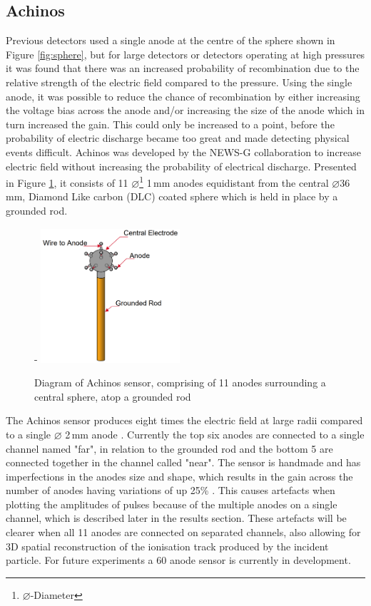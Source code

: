 \documentclass[a4paper]{article}
\begin{document}
\subsection{Achinos} \label{Ach}
Previous detectors used a single anode at the centre of the sphere shown in Figure \ref{fig:sphere}, but for large detectors or detectors operating at high pressures it was found that there was an increased probability of recombination due to the relative strength of the electric field compared to the pressure. Using the single anode, it was possible to reduce the chance of recombination by either increasing the voltage bias across the anode and/or increasing the size of the anode which in turn increased the gain. This could only be increased to a point, before the probability of electric discharge became too great and made detecting physical events difficult. 
\newline Achinos was developed by the NEWS-G collaboration to increase electric field without increasing the probability of electrical discharge. Presented in Figure \ref{fig:achinos}, it consists of 11 $\diameter$\footnote{$\diameter$-Diameter} 1\,mm anodes equidistant from the central $\diameter$36\,mm, Diamond Like carbon (DLC) coated sphere which is held in place by a grounded rod. 
\begin{figure}[H]-
    \centering
    \includegraphics[height=5cm]{achinos.png}
    \caption{Diagram of Achinos sensor, comprising of 11 anodes surrounding a central sphere, atop a grounded rod \cite{Giomataris_2020}}
    \label{fig:achinos}
\end{figure}
\noindent The Achinos sensor produces eight times the electric field at large radii compared to a single $\diameter$  2\,mm anode \cite{Giganon_2017}. Currently the top six anodes are connected to a single channel named "far", in relation to the grounded rod and the bottom 5 are connected together in the channel called "near". The sensor is handmade and has imperfections in the anodes size and shape, which results in the gain across the number of anodes having variations of up 25\% \cite{Giomataris_2020}. This causes artefacts when plotting the amplitudes of pulses because of the multiple anodes on a single channel, which is described later in the results section. These artefacts will be clearer when all 11 anodes are connected on separated channels, also allowing for 3D spatial reconstruction of the ionisation track produced by the incident particle. For future experiments a 60 anode sensor is currently in development. 
\end{document}
